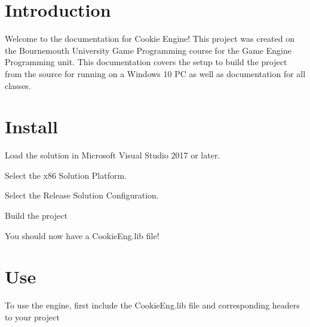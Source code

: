 \hypertarget{index_sec_intro}{}\section{Introduction}\label{index_sec_intro}
Welcome to the documentation for Cookie Engine! This project was created on the Bournemouth University Game Programming course for the Game Engine Programming unit. This documentation covers the setup to build the project from the source for running on a Windows 10 PC as well as documentation for all classes.\hypertarget{index_sec_running}{}\section{Install}\label{index_sec_running}

\begin{DoxyEnumerate}
\item Load the solution in Microsoft Visual Studio 2017 or later.
\item Select the x86 Solution Platform.
\item Select the Release Solution Configuration.
\item Build the project
\item You should now have a Cookie\+Eng.\+lib file!
\end{DoxyEnumerate}\hypertarget{index_sec_use}{}\section{Use}\label{index_sec_use}
To use the engine, first include the Cookie\+Eng.\+lib file and corresponding headers to your project 
